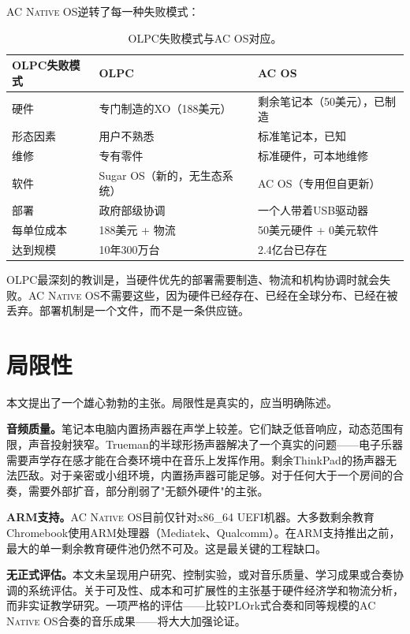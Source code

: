 \documentclass[10pt,letterpaper,twocolumn]{article}
\newcommand{\acos}{\textsc{AC Native OS}}
\begin{document}
\acos{}逆转了每一种失败模式：

\begin{table}[h]
\small
\centering
\begin{tabularx}{\columnwidth}{lXX}
\toprule
\textbf{OLPC失败模式} & \textbf{OLPC} & \textbf{AC OS} \\
\midrule
硬件 & 专门制造的XO（188美元） & 剩余笔记本（50美元），已制造 \\
形态因素 & 用户不熟悉 & 标准笔记本，已知 \\
维修 & 专有零件 & 标准硬件，可本地维修 \\
软件 & Sugar OS（新的，无生态系统） & AC OS（专用但自更新） \\
部署 & 政府部级协调 & 一个人带着USB驱动器 \\
每单位成本 & 188美元 + 物流 & 50美元硬件 + 0美元软件 \\
达到规模 & 10年300万台 & 2.4亿台已存在 \\
\bottomrule
\end{tabularx}
\caption{OLPC失败模式与AC OS对应。}
\label{tab:olpc}
\end{table}

OLPC最深刻的教训是，当硬件优先的部署需要制造、物流和机构协调时就会失败。\acos{}不需要这些，因为硬件已经存在、已经在全球分布、已经在被丢弃。部署机制是一个文件，而不是一条供应链。


\section{局限性}
\label{sec:limitations}

本文提出了一个雄心勃勃的主张。局限性是真实的，应当明确陈述。

\textbf{音频质量。}笔记本电脑内置扬声器在声学上较差。它们缺乏低音响应，动态范围有限，声音投射狭窄。Trueman的半球形扬声器解决了一个真实的问题——电子乐器需要声学存在感才能在合奏环境中在音乐上发挥作用。剩余ThinkPad的扬声器无法匹敌。对于亲密或小组环境，内置扬声器可能足够。对于任何大于一个房间的合奏，需要外部扩音，部分削弱了"无额外硬件"的主张。

\textbf{ARM支持。}\acos{}目前仅针对x86\_64 UEFI机器。大多数剩余教育Chromebook使用ARM处理器（Mediatek、Qualcomm）。在ARM支持推出之前，最大的单一剩余教育硬件池仍然不可及。这是最关键的工程缺口。

\textbf{无正式评估。}本文未呈现用户研究、控制实验，或对音乐质量、学习成果或合奏协调的系统评估。关于可及性、成本和可扩展性的主张基于硬件经济学和物流分析，而非实证教学研究。一项严格的评估——比较PLOrk式合奏和同等规模的\acos{}合奏的音乐成果——将大大加强论证。
\end{document}
